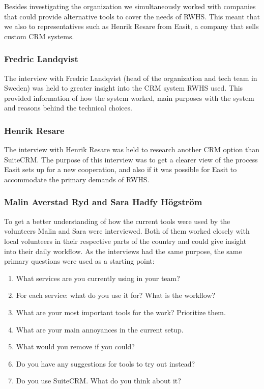 Besides investigating the organization we simultaneously worked  with companies that could provide alternative tools to cover the needs of RWHS. This meant that we also  to representatives such as Henrik Resare from Easit, a company that sells custom CRM systems.

\subsubsection{Fredric Landqvist}
\label{sec:method:interviews:fredric}
The  interview with Fredric Landqvist (head of the organization and tech team in Sweden) was held to  greater insight into the CRM system RWHS used. This provided information of how the system worked, main purposes with the system and reasons behind the technical choices.

\subsubsection{Henrik Resare}
\label{sec:method:interviews:henrik}
The interview with Henrik Resare was held to research another CRM option than SuiteCRM. The purpose of this interview was to get a clearer view of the process Easit sets up for a new cooperation, and also if it was possible for Easit to accommodate the primary demands of RWHS.

\subsubsection{Malin Averstad Ryd and Sara Hadfy Högström}
\label{sec:method:interviews:malinandsara}
To get a better understanding of how the current tools were used by the volunteers Malin and Sara were interviewed. Both of them worked closely with local volunteers in their respective parts of the country and could give insight into their daily workflow. As the interviews had the same purpose, the same primary questions were used as a starting point:
\begin{enumerate}
\item What services are you currently using in your team?
\item For each service: what do you use it for? What is the workflow?
\item What are your most important tools for the work? Prioritize them.
\item What are your main annoyances in the current setup.
\item What would you remove if you could?
\item Do you have any suggestions for tools to try out instead?
\item Do you use SuiteCRM. What do you think about it?
\end{enumerate}

